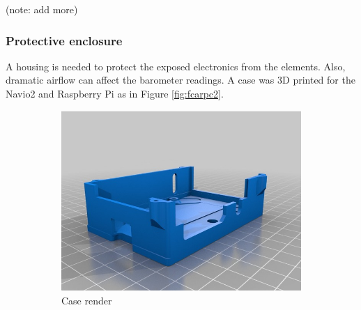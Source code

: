 (note: add more)

\subsubsection{Protective enclosure}

A housing is needed to protect the exposed electronics from the elements. Also, dramatic airflow can affect the barometer readings. A case \cite{3d_case} was 3D printed for the Navio2 and Raspberry Pi as in Figure \ref{fig:fcarpc2}.

\begin{figure}[H]
\begin{subfigure}{0.5\textwidth}
\centering
\includegraphics[scale=0.25]{images/drone-build-3d-case-render.jpg}
\caption{Case render}
\label{fig:fcarpc1}
\end{subfigure}
\begin{subfigure}{0.5\textwidth}
\centering

\end{subfigure}
\end{figure}

